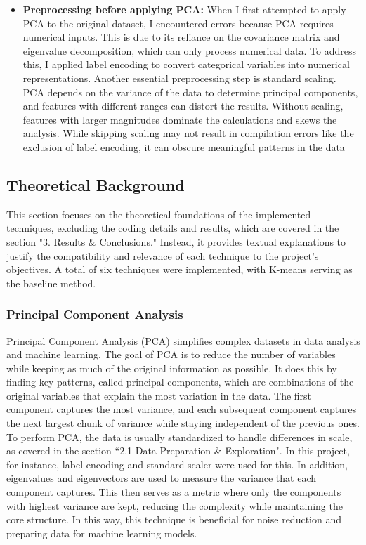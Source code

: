 \documentclass[11pt]{article}
\begin{document}
\begin{itemize}
	\item \textbf{Preprocessing before applying PCA:} When I first attempted to apply PCA to the original dataset, I encountered errors because PCA requires numerical inputs. This is due to its reliance on the covariance matrix and eigenvalue decomposition, which can only process numerical data. To address this, I applied label encoding to convert categorical variables into numerical representations. Another essential preprocessing step is standard scaling. PCA depends on the variance of the data to determine principal components, and features with different ranges can distort the results. Without scaling, features with larger magnitudes dominate the calculations and skews the analysis. While skipping scaling may not result in compilation errors like the exclusion of label encoding, it can obscure meaningful patterns in the data

\end{itemize}
\vspace{1\baselineskip}
\subsection{Theoretical Background}

This section focuses on the theoretical foundations of the implemented techniques, excluding the coding details and results, which are covered in the section "3. Results $\&$ Conclusions." Instead, it provides textual explanations to justify the compatibility and relevance of each technique to the project’s objectives. A total of six techniques were implemented, with K-means serving as the baseline method.

\vspace{1\baselineskip}
\subsubsection{Principal Component Analysis}

Principal Component Analysis (PCA) simplifies complex datasets in data analysis and machine learning. The goal of PCA is to reduce the number of variables while keeping as much of the original information as possible. It does this by finding key patterns, called principal components, which are combinations of the original variables that explain the most variation in the data. The first component captures the most variance, and each subsequent component captures the next largest chunk of variance while staying independent of the previous ones. To perform PCA, the data is usually standardized to handle differences in scale, as covered in the section ``2.1 Data Preparation $\&$ Exploration". In this project, for instance, label encoding and standard scaler were used for this. In addition, eigenvalues and eigenvectors are used to measure the variance that each component captures. This then serves as a metric where only the components with highest variance are kept, reducing the complexity while maintaining the core structure. In this way, this technique is beneficial for noise reduction and preparing data for machine learning models.
\end{document}
